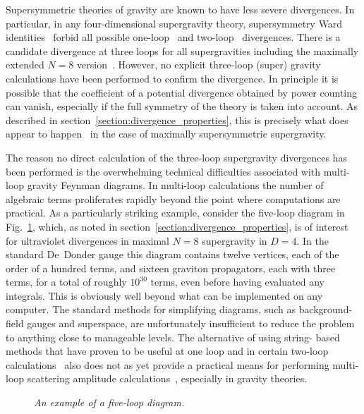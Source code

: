 Supersymmetric theories of gravity are known to have less severe
divergences. In particular, in any four-dimensional supergravity
theory, supersymmetry Ward
identities~\cite{Grisaru77SWIA,Grisaru77SWIB} forbid all possible
one-loop~\cite{OneLoopSUGRA} and two-loop~\cite{Grisaru77,Tomboulis77}
divergences.  There is a candidate divergence at three loops for all
supergravities including the maximally extended $N=8$
version~\cite{Deser77,Howe81,KalloshNeight,Howe89}.  However, no
explicit three-loop (super) gravity calculations have been performed
to confirm the divergence.  In principle it is possible that the coefficient
of a potential divergence obtained by power counting can vanish,
especially if the full symmetry of the theory is taken into account.
As described in section~\ref{section:divergence_properties}, this is
precisely what does appear to happen~\cite{BDDPR,Stelle} in the case
of maximally supersymmetric supergravity.

The reason no direct calculation of the three-loop supergravity
divergences has been performed is the overwhelming technical
difficulties associated with multi-loop gravity Feynman diagrams.  In
multi-loop calculations the number of algebraic terms proliferates
rapidly beyond the point where computations are practical.  As a
particularly striking example, consider the five-loop diagram in
Fig.~\ref{figure:Multiloop}, which, as noted in
section~\ref{section:divergence_properties}, is of interest for
ultraviolet divergences in maximal $N=8$ supergravity in $D=4$.  In
the standard De~Donder gauge this diagram contains twelve vertices,
each of the order of a hundred terms, and sixteen graviton
propagators, each with three terms, for a total of roughly $10^{30}$
terms, even before having evaluated any integrals.  This is obviously
well beyond what can be implemented on any computer. The standard
methods for simplifying diagrams, such as background-field gauges and
superspace, are unfortunately insufficient to reduce the problem to
anything close to manageable levels. The alternative of using string-
based methods that have proven to be useful at one loop and in
certain two-loop
calculations~\cite{Long,BDS,Schmidt94,DunbarNorridge95,DunbarNorridge97,
Dunbar02,Schubert01} also does not as yet provide a practical means
for performing multi-loop scattering amplitude
calculations~\cite{Roland92,Roland96,DiVecchia96,Roland98,Frizzo00},
especially in gravity theories.


\begin{figure}[h]
  \def\epsfsize#1#2{0.3#1}
  \centerline{}
  \caption{\it An example of a five-loop diagram.}
  \label{figure:Multiloop}
\end{figure}


